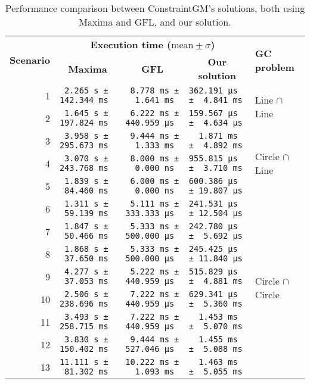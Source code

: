 \begin{table}[htb]
  \caption[ConstraintGM performance benchmarks]{\label{tab:eval.cgm.perf}%
    Performance comparison between ConstraintGM's solutions, both using Maxima
    and \ac{GFL}, and our solution.}
  \footnotesize\centering
  \begin{tabular*}{\linewidth}{r*{3}{l}l}
    \toprule
    \multirow{2}{*}{\textbf{Scenario}}
    & \multicolumn{3}{c}{\textbf{Execution time ($\mathrm{mean}\pm\sigma$)}}
    & \multirow{2}{*}{\textbf{GC problem}} \\
    & \multicolumn{1}{c}{\textbf{Maxima}}
    & \multicolumn{1}{c}{\textbf{GFL}}
    & \multicolumn{1}{c}{\textbf{Our solution}} & \\
    \midrule
     1 & \texttt{~2.265 s ± 142.344 ms}
       & \texttt{~8.778 ms ± ~~1.641 ms}
       & \texttt{362.191 μs ± ~4.841 ms}
       & \multirow{2}{*}{Line $\cap$ Line}\\
     2 & \texttt{~1.645 s ± 197.824 ms}
       & \texttt{~6.222 ms ± 440.959 μs}
       & \texttt{159.567 μs ± ~4.634 μs} &\\
    \midrule
     3 & \texttt{~3.958 s ± 295.673 ms}
       & \texttt{~9.444 ms ± ~~1.333 ms}
       & \texttt{~~1.871 ms ± ~4.892 ms} 
       & \multirow{3}{*}{Circle $\cap$ Line}\\
     4 & \texttt{~3.070 s ± 243.768 ms}
       & \texttt{~8.000 ms ± ~~0.000 ns}
       & \texttt{955.815 μs ± ~3.710 ms} &\\
     5 & \texttt{~1.839 s ± ~84.460 ms}
       & \texttt{~6.000 ms ± ~~0.000 ns}
       & \texttt{600.386 μs ± 19.807 μs} &\\
    \midrule
     6 & \texttt{~1.311 s ± ~59.139 ms}
       & \texttt{~5.111 ms ± 333.333 μs}
       & \texttt{241.531 μs ± 12.504 μs} 
       & \multirow{8}{*}{Circle $\cap$ Circle}\\
     7 & \texttt{~1.847 s ± ~50.466 ms}
       & \texttt{~5.333 ms ± 500.000 μs}
       & \texttt{242.780 μs ± ~5.692 μs} &\\
     8 & \texttt{~1.868 s ± ~37.650 ms}
       & \texttt{~5.333 ms ± 500.000 μs}
       & \texttt{245.425 μs ± 11.840 μs} &\\
     9 & \texttt{~4.277 s ± ~37.053 ms}
       & \texttt{~5.222 ms ± 440.959 μs}
       & \texttt{515.829 μs ± ~4.881 ms} &\\
    10 & \texttt{~2.506 s ± 238.696 ms}
       & \texttt{~7.222 ms ± 440.959 μs}
       & \texttt{629.341 μs ± ~5.360 ms} &\\
    11 & \texttt{~3.493 s ± 258.715 ms}
       & \texttt{~7.222 ms ± 440.959 μs}
       & \texttt{~~1.453 ms ± ~5.070 ms} &\\
    12 & \texttt{~3.830 s ± 150.402 ms}
       & \texttt{~9.444 ms ± 527.046 μs}
       & \texttt{~~1.455 ms ± ~5.088 ms} &\\
    13 & \texttt{11.111 s ± ~81.302 ms}
       & \texttt{10.222 ms ± ~~1.093 ms}
       & \texttt{~~1.463 ms ± ~5.055 ms} &\\
    \bottomrule
  \end{tabular*}
\end{table}

